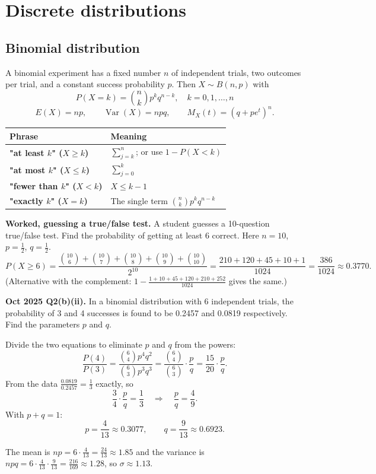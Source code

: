 \documentclass[11pt,a4paper]{article}
\begin{document}
\section{Discrete distributions}

\subsection{Binomial distribution}
A binomial experiment has a fixed number $n$ of independent trials, two outcomes per trial, and a constant success probability $p$. Then $X\sim B(n,p)$ with
\[
\boxed{P(X=k)=\binom nk p^k q^{n-k},\quad k=0,1,\dots,n}
\]
\[
E(X)=np,\qquad \operatorname{Var}(X)=npq,\qquad M_X(t)=(q+pe^t)^n.
\]

\begin{center}\small
\begin{tabularx}{\textwidth}{>{\bfseries}p{} X}
\toprule Phrase & Meaning\\\midrule
"at least $k$" ($X\ge k$) & $\sum_{j=k}^{n}$; or use $1-P(X<k)$\\
"at most $k$" ($X\le k$) & $\sum_{j=0}^{k}$\\
"fewer than $k$" ($X<k$) & $X\le k-1$\\
"exactly $k$" ($X=k$) & The single term $\binom nk p^kq^{n-k}$\\\bottomrule
\end{tabularx}
\end{center}

\begin{exambox}
\textbf{Worked, guessing a true/false test.} A student guesses a 10-question true/false test. Find the probability of getting at least 6 correct. Here $n=10$, $p=\frac12$, $q=\frac12$.
\[
P(X\ge 6)=\frac{\binom{10}6+\binom{10}7+\binom{10}8+\binom{10}9+\binom{10}{10}}{2^{10}}
=\frac{210+120+45+10+1}{1024}=\frac{386}{1024}\approx\boxed{0.3770}.
\]
(Alternative with the complement: $1-\frac{1+10+45+120+210+252}{1024}$ gives the same.)
\end{exambox}

\begin{pyqbox}
\textbf{Oct 2025 Q2(b)(ii).} In a binomial distribution with 6 independent trials, the probability of 3 and 4 successes is found to be 0.2457 and 0.0819 respectively. Find the parameters $p$ and $q$.
\end{pyqbox}

\begin{solbox}
Divide the two equations to eliminate $p$ and $q$ from the powers:
\[
\frac{P(4)}{P(3)}=\frac{\binom64 p^4q^2}{\binom63 p^3q^3}
=\frac{\binom64}{\binom63}\cdot\frac pq
=\frac{15}{20}\cdot\frac pq.
\]
From the data $\frac{0.0819}{0.2457}=\frac13$ exactly, so
\[
\frac34\cdot\frac pq=\frac13\quad\Longrightarrow\quad \frac pq=\frac49.
\]
With $p+q=1$:
\[
p=\frac4{13}\approx0.3077,\qquad q=\frac9{13}\approx0.6923.
\]

The mean is $np=6\cdot\frac4{13}=\frac{24}{13}\approx1.85$ and the variance is $npq=6\cdot\frac4{13}\cdot\frac9{13}=\frac{216}{169}\approx1.28$, so $\sigma\approx1.13$.
\end{solbox}
\end{document}
